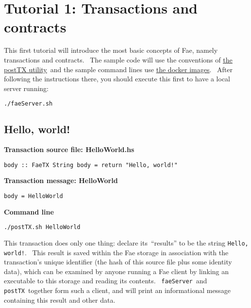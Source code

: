 \documentclass[11pt]{article}
\newcommand{\codeblock}[1]{\begin{mdframed}[
    backgroundcolor=header-color,
    linecolor=header-color,
    innertopmargin=10pt,
    ]{\texttt{#1}}\end{mdframed}}
\DeclareRobustCommand{\fuline}[1]{\texorpdfstring{\uline{#1}}{#1}}
\begin{document}
\section{Tutorial 1: Transactions and contracts}
\vspace{5.5pt}

This first tutorial will introduce the most basic concepts of Fae, namely transactions and contracts.  The sample code will use the conventions of \href{https://consensys.quip.com/kN9MAhiNm8dz/Project-information\%23GTTACAArd2o}{\fuline{the postTX utility}} and the sample command lines use \href{https://consensys.quip.com/kN9MAhiNm8dz/Project-information\%23GTTACAfd57C}{\fuline{the docker images}}.  After following the instructions there, you should execute this first to have a local server running:

\codeblock{.\slash{}faeServer.sh}

\subsection{Hello, world!}
\vspace{5.5pt}

\textbf{Transaction source file: HelloWorld.hs}

\codeblock{body :: FaeTX String\newline
body = return "Hello, world!"}

\textbf{Transaction message: HelloWorld}

\codeblock{body = HelloWorld}

\textbf{Command line}

\codeblock{.\slash{}postTX.sh HelloWorld}

This transaction does only one thing: declare its “results” to be the string \texttt{Hello, world!}.  This result is saved within the Fae storage in association with the transaction's unique identifier (the hash of this source file plus some identity data), which can be examined by anyone running a Fae client by linking an executable to this storage and reading its contents.  \texttt{faeServer} and \texttt{postTX} together form such a client, and will print an informational message containing this result and other data.


\vspace{11pt}
\end{document}
